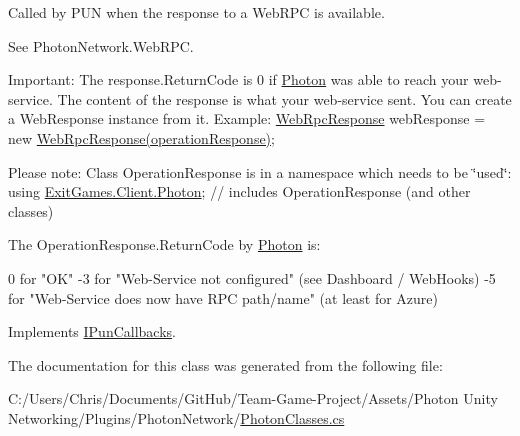 Called by P\+UN when the response to a Web\+R\+PC is available. 

See Photon\+Network.\+Web\+R\+PC. 

Important\+: The response.\+Return\+Code is 0 if \hyperlink{namespace_photon}{Photon} was able to reach your web-\/service. The content of the response is what your web-\/service sent. You can create a Web\+Response instance from it. Example\+: \hyperlink{class_web_rpc_response}{Web\+Rpc\+Response} web\+Response = new \hyperlink{class_web_rpc_response}{Web\+Rpc\+Response(operation\+Response)};

Please note\+: Class Operation\+Response is in a namespace which needs to be \char`\"{}used\char`\"{}\+: using \hyperlink{namespace_exit_games_1_1_client_1_1_photon}{Exit\+Games.\+Client.\+Photon}; // includes Operation\+Response (and other classes)

The Operation\+Response.\+Return\+Code by \hyperlink{namespace_photon}{Photon} is\+:
\begin{DoxyPre}
 0 for "OK"
-3 for "Web-Service not configured" (see Dashboard / WebHooks)
-5 for "Web-Service does now have RPC path/name" (at least for Azure)\end{DoxyPre}
 

Implements \hyperlink{interface_i_pun_callbacks_aae3221aa2d3b999574fc55a6aaee2877}{I\+Pun\+Callbacks}.



The documentation for this class was generated from the following file\+:\begin{DoxyCompactItemize}
\item 
C\+:/\+Users/\+Chris/\+Documents/\+Git\+Hub/\+Team-\/\+Game-\/\+Project/\+Assets/\+Photon Unity Networking/\+Plugins/\+Photon\+Network/\hyperlink{_photon_classes_8cs}{Photon\+Classes.\+cs}\end{DoxyCompactItemize}
